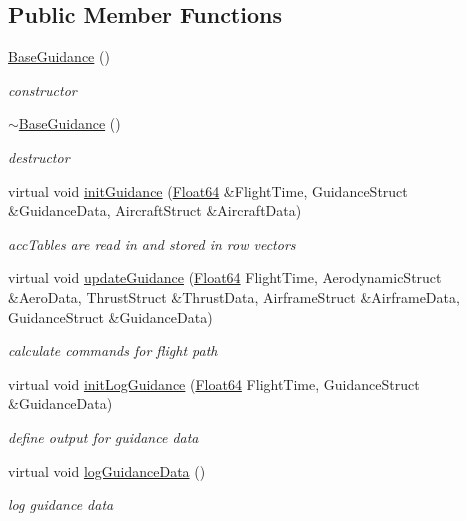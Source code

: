 \subsection*{Public Member Functions}
\begin{DoxyCompactItemize}
\item 
\hyperlink{class_base_guidance_aa96d54da1d306fcfbf05705eabc91c55}{Base\+Guidance} ()
\begin{DoxyCompactList}\small\item\em constructor \end{DoxyCompactList}\item 
\hyperlink{class_base_guidance_a28666e14c8ecedcfb33191ee273316c6}{$\sim$\+Base\+Guidance} ()
\begin{DoxyCompactList}\small\item\em destructor \end{DoxyCompactList}\item 
virtual void \hyperlink{class_base_guidance_a8eacaa605a7691b5cc23870e98615551}{init\+Guidance} (\hyperlink{group___tools_ga3f1431cb9f76da10f59246d1d743dc2c}{Float64} \&Flight\+Time, Guidance\+Struct \&Guidance\+Data, Aircraft\+Struct \&Aircraft\+Data)
\begin{DoxyCompactList}\small\item\em acc\+Tables are read in and stored in row vectors \end{DoxyCompactList}\item 
virtual void \hyperlink{class_base_guidance_a0092008303b3fcc7664d04892c4878c3}{update\+Guidance} (\hyperlink{group___tools_ga3f1431cb9f76da10f59246d1d743dc2c}{Float64} Flight\+Time, Aerodynamic\+Struct \&Aero\+Data, Thrust\+Struct \&Thrust\+Data, Airframe\+Struct \&Airframe\+Data, Guidance\+Struct \&Guidance\+Data)
\begin{DoxyCompactList}\small\item\em calculate commands for flight path \end{DoxyCompactList}\item 
virtual void \hyperlink{class_base_guidance_ac1c54d52fe315199e45061060602be0f}{init\+Log\+Guidance} (\hyperlink{group___tools_ga3f1431cb9f76da10f59246d1d743dc2c}{Float64} Flight\+Time, Guidance\+Struct \&Guidance\+Data)
\begin{DoxyCompactList}\small\item\em define output for guidance data \end{DoxyCompactList}\item 
virtual void \hyperlink{class_base_guidance_af3bd60f6f17739864fbfa3ec2467ae04}{log\+Guidance\+Data} ()
\begin{DoxyCompactList}\small\item\em log guidance data \end{DoxyCompactList}\end{DoxyCompactItemize}


